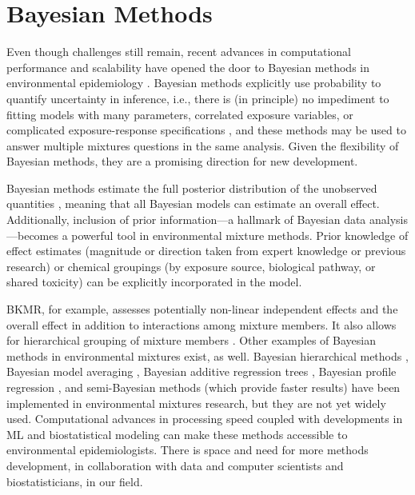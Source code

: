 \section{Bayesian Methods}\label{sec:Bayes}
Even though challenges still remain, recent advances in computational performance and scalability have opened the door to Bayesian methods in environmental epidemiology \citep{hoffman2013stochastic}. Bayesian methods explicitly use probability to quantify uncertainty in inference, i.e., there is (in principle) no impediment to fitting models with many parameters, correlated exposure variables, or complicated exposure-response specifications \citep{bda3}, and these methods may be used to answer multiple mixtures questions in the same analysis. Given the flexibility of Bayesian methods, they are a promising direction for new development.

Bayesian methods estimate the full posterior distribution of the unobserved quantities \citep{bda3}, meaning that all Bayesian models can estimate an overall effect. Additionally, inclusion of prior information---a hallmark of Bayesian data analysis---becomes a powerful tool in environmental mixture methods. Prior knowledge of effect estimates (magnitude or direction taken from expert knowledge or previous research) or chemical groupings (by exposure source, biological pathway, or shared toxicity) can be explicitly incorporated in the model.

BKMR, for example, assesses potentially non-linear independent effects and the overall effect in addition to interactions among mixture members. It also allows for hierarchical grouping of mixture members \citep{bobb2014bayesian, coull2015, bobb2018statistical}. Other examples of Bayesian methods in environmental mixtures exist, as well. Bayesian hierarchical methods \citep{maclehose2007bayesian, maclehose2014applications, furlong2017prenatal}, Bayesian model averaging \citep{fragoso2018bayesian, wilson2018model, berger2018associations, berger2018prenatal, berger2018associations2}, Bayesian additive regression trees \citep{park2014environmental, chipman2010bart, ko2016classification}, Bayesian profile regression \citep{coker2018multi, coker2017association, molitor2010bayesian}, and semi-Bayesian methods (which provide faster results) \citep{mak13_org,kalkbrenner2010perinatal,momoli2010analysis} have been implemented in environmental mixtures research, but they are not yet widely used. Computational advances in processing speed coupled with developments in ML and biostatistical modeling can make these methods accessible to environmental epidemiologists. There is space and need for more methods development, in collaboration with data and computer scientists and biostatisticians, in our field.

